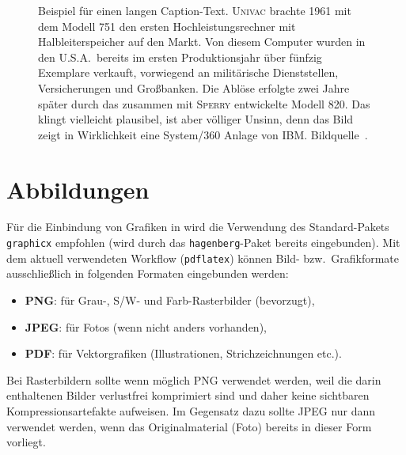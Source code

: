 \begin{figure}
\centering
{}  %
\caption{Beispiel für einen langen Caption-Text. \textsc{Univac}
brachte 1961 mit dem Modell 751 den ersten Hochleistungsrechner
mit Halbleiterspeicher auf den Markt. Von diesem Computer wurden
in den U.S.A.\ bereits im ersten Produktionsjahr über fünfzig
Exemplare verkauft, vorwiegend an militärische Dienststellen,
Versicherungen und Großbanken. Die Ablöse erfolgte zwei Jahre
später durch das zusammen mit \textsc{Sperry} entwickelte Modell 820.
Das klingt vielleicht plausibel, ist aber völliger Unsinn, denn das
Bild zeigt in Wirklichkeit eine System/360 Anlage von IBM. 
Bildquelle~\cite{IBM360}.} 
\label{fig:ibm360}
\end{figure}





\section{Abbildungen}

Für die Einbindung von Grafiken in \latex wird die Verwendung des Stan\-dard-Pakets
\texttt{graphicx} \cite{Carlisle2014} empfohlen 
(wird durch das \texttt{hagenberg}-Paket bereits eingebunden). 
Mit dem aktuell verwendeten Workflow (\texttt{pdflatex})
können Bild- bzw.\ Grafikformate ausschließlich 
in folgenden Formaten eingebunden werden:
%
\begin{itemize}
	\item \textbf{PNG}: für Grau-, S/W- und Farb-Rasterbilder (bevorzugt),
	\item \textbf{JPEG}: für Fotos (wenn nicht anders vorhanden),
	\item \textbf{PDF}: für Vektorgrafiken (Illustrationen, Strichzeichnungen etc.).
\end{itemize}
%
Bei Rasterbildern sollte wenn möglich PNG verwendet werden, weil die darin 
enthaltenen Bilder verlustfrei komprimiert sind und daher keine sichtbaren Kompressionsartefakte
aufweisen. Im Gegensatz dazu sollte JPEG nur dann verwendet werden, wenn das Originalmaterial
(Foto) bereits in dieser Form vorliegt.


